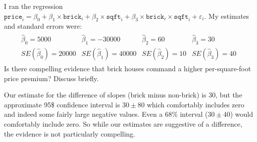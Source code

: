 \documentclass[addpoints,12pt]{exam}
\begin{document}
\begin{questions}
\question I ran the regression $\texttt{price}_i = \beta_0 + \beta_1 \times \texttt{brick}_i + \beta_2 \times \texttt{sqft}_i + \beta_3 \times \texttt{brick}_i \times \texttt{sqft}_i + \varepsilon_i$.
My estimates and standard errors were:
\begin{align*}
  \begin{array}{cccc}
    \widehat{\beta}_0 = 5000 & \widehat{\beta}_1 = -30000 & \widehat{\beta}_2 = 60 & \widehat{\beta}_3 = 30\\
    SE(\widehat{\beta}_0) = 20000 & SE(\widehat{\beta}_1) = 40000 & SE(\widehat{\beta}_2) = 10 & SE(\widehat{\beta}_3) = 40 
 \end{array}
 \end{align*}
Is there compelling evidence that brick houses command a higher per-square-foot price premium?
Discuss briefly.
\begin{solution}
  Our estimate for the difference of slopes (brick minus non-brick) is $30$, but the approximate 95\$ confidence interval is $30 \pm 80$ which comfortably includes zero and indeed some fairly large negative values.
  Even a 68\% interval ($30 \pm 40$) would comfortably include zero.
  So while our estimates are suggestive of a difference, the evidence is not particularly compelling.
\end{solution}



\end{questions}
\end{document}
